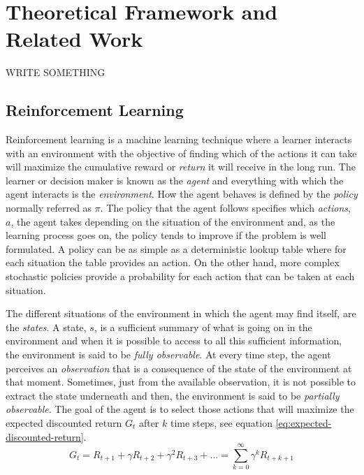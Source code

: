 \chapter{Theoretical Framework and Related Work}
\label{chapter:Theoretical Framework and Related Work}

WRITE SOMETHING

\section{Reinforcement Learning}
\label{section:Reinforcement Learning}

Reinforcement learning is a machine learning technique where a learner interacts with an environment with the objective of finding which of the actions it can take will maximize the cumulative reward or \textit{return} it will receive in the long run\cite{Sutton:1998}. The learner or decision maker is known as the \textit{agent} and everything with which the agent interacts is the \textit{environment}. How the agent behaves is defined by the \textit{policy} normally referred as $\pi$. The policy that the agent follows specifies which \textit{actions}, $a$, the agent takes depending on the situation of the environment and, as the learning process goes on, the policy tends to improve if the problem is well formulated.  A policy can be as simple as a deterministic lookup table where for each situation the table provides an action. On the other hand, more complex stochastic policies provide a probability for each action that can be taken at each situation.

The different situations of the environment in which the agent may find itself, are the \textit{states}. A state, $s$, is a sufficient summary of what is going on in the environment and when it is possible to access to all this sufficient information, the environment is said to be \textit{fully observable}. At every time step, the agent perceives an \textit{observation} that is a consequence of the state of the environment at that moment. Sometimes, just from the available observation, it is not possible to extract the state underneath and then, the environment is said to be \textit{partially observable}. The goal of the agent is to select those actions that will maximize the expected discounted return $G_t$ after $k$ time steps, see equation \ref{eq:expected-discounted-return}.
\begin{equation}
G_t = R_{t+1} + \gamma R_{t+2} + \gamma^2 R_{t+3} +... = \sum_{k=0}^{\infty} \gamma ^k R_{t+k+1}
\label{eq:expected-discounted-return}
\end{equation}


